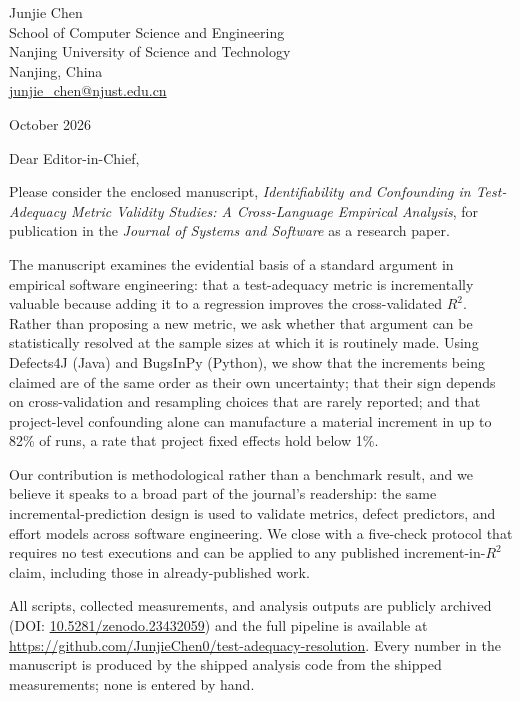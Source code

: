 \documentclass[11pt]{article}
\begin{document}
\begin{flushright}
Junjie Chen\\
School of Computer Science and Engineering\\
Nanjing University of Science and Technology\\
Nanjing, China\\
\href{mailto:junjie_chen@njust.edu.cn}{junjie\_chen@njust.edu.cn}
\end{flushright}

\vspace{1em}
 October 2026

\vspace{1em}
\noindent Dear Editor-in-Chief,

\vspace{0.5em}
Please consider the enclosed manuscript, \emph{Identifiability and Confounding in
Test-Adequacy Metric Validity Studies: A Cross-Language Empirical Analysis}, for
publication in the \emph{Journal of Systems and Software} as a research paper.

The manuscript examines the evidential basis of a standard argument in empirical
software engineering: that a test-adequacy metric is incrementally valuable
because adding it to a regression improves the cross-validated $R^2$. Rather than
proposing a new metric, we ask whether that argument can be statistically
resolved at the sample sizes at which it is routinely made. Using Defects4J
(Java) and BugsInPy (Python), we show that the increments being claimed are of
the same order as their own uncertainty; that their sign depends on
cross-validation and resampling choices that are rarely reported; and that
project-level confounding alone can manufacture a material increment in up to
82\% of runs, a rate that project fixed effects hold below 1\%.

Our contribution is methodological rather than a benchmark result, and we
believe it speaks to a broad part of the journal's readership: the same
incremental-prediction design is used to validate metrics, defect predictors,
and effort models across software engineering. We close with a five-check
protocol that requires no test executions and can be applied to any published
increment-in-$R^2$ claim, including those in already-published work.

All scripts, collected measurements, and analysis outputs are publicly archived
(DOI: \href{https://doi.org/10.5281/zenodo.23432059}{10.5281/zenodo.23432059})
and the full pipeline is available at
\url{https://github.com/JunjieChen0/test-adequacy-resolution}. Every number in
the manuscript is produced by the shipped analysis code from the shipped
measurements; none is entered by hand.
\end{document}
